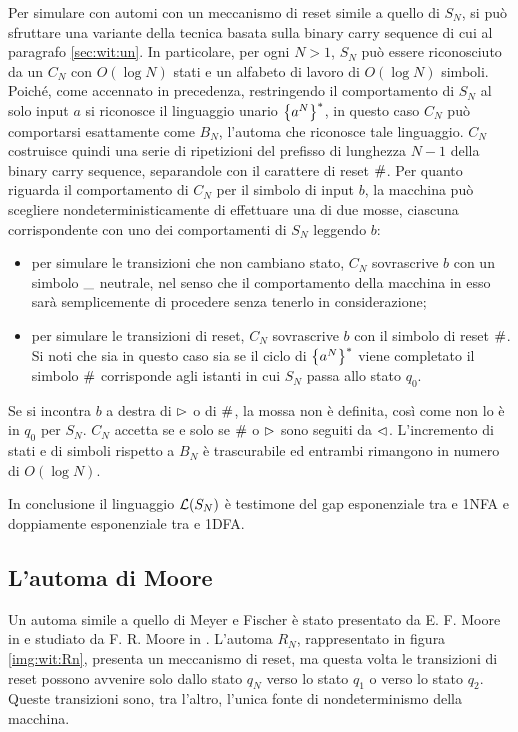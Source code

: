 Per simulare con  automi con un meccanismo di reset simile a quello di $S_N$, si può sfruttare una variante della tecnica basata sulla binary carry sequence di cui al paragrafo \ref{sec:wit:un}. In particolare, per ogni $N>1$, $S_N$ può essere riconosciuto da un  $C_N$ con $O(\log N)$ stati e un alfabeto di lavoro di $O(\log N)$ simboli.
Poiché, come accennato in precedenza, restringendo il comportamento di $S_N$ al solo input $a$ si riconosce il linguaggio unario $\left\{ a^N \right\}^*$, in questo caso $C_N$ può comportarsi esattamente come $B_N$, l'automa che riconosce tale linguaggio. $C_N$ costruisce quindi una serie di ripetizioni del prefisso di lunghezza $N-1$ della binary carry sequence, separandole con il carattere di reset $\#$. Per quanto riguarda il comportamento di $C_N$ per il simbolo di input $b$, la macchina può scegliere nondeterministicamente di effettuare una di due mosse, ciascuna corrispondente con uno dei comportamenti di $S_N$ leggendo $b$:
\begin{itemize}
	\item per simulare le transizioni che non cambiano stato, $C_N$ sovrascrive $b$ con un simbolo $\_$ neutrale, nel senso che il comportamento della macchina in esso sarà semplicemente di procedere senza tenerlo in considerazione;
	\item per simulare le transizioni di reset, $C_N$ sovrascrive $b$ con il simbolo di reset $\#$. Si noti che sia in questo caso sia se il ciclo di $\left\{ a^N \right\}^*$ viene completato il simbolo $\#$ corrisponde agli istanti in cui $S_N$ passa allo stato $q_0$.
\end{itemize}
Se si incontra $b$ a destra di $\rhd$ o di $\#$, la mossa non è definita, così come non lo è in $q_0$ per $S_N$. $C_N$ accetta se e solo se $\#$ o $\rhd$ sono seguiti da $\lhd$. L'incremento di stati e di simboli rispetto a $B_N$ è trascurabile ed entrambi rimangono in numero di $O(\log N)$.

In conclusione il linguaggio $\mathcal L(S_N)$ è testimone del gap esponenziale tra  e 1NFA e doppiamente esponenziale tra  e 1DFA.


\subsection{L'automa di Moore}
Un automa simile a quello di Meyer e Fischer è stato presentato da E. F. Moore in \cite{Moore:56:gendanken} e studiato da F. R. Moore in \cite{Moore:71:automatabounds}. L'automa $R_N$, rappresentato in figura \ref{img:wit:Rn}, presenta un meccanismo di reset, ma questa volta le transizioni di reset possono avvenire solo dallo stato $q_N$ verso lo stato $q_1$ o verso lo stato $q_2$. Queste transizioni sono, tra l'altro, l'unica fonte di nondeterminismo della macchina.

